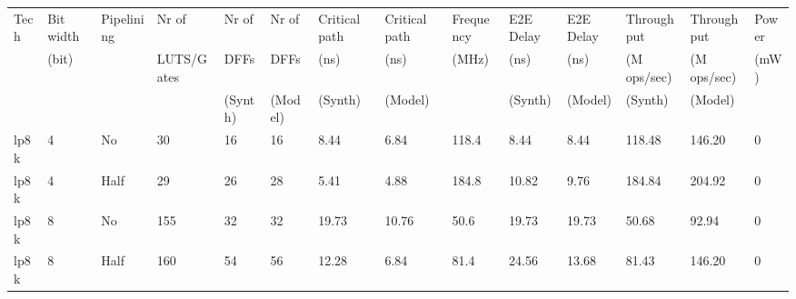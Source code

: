 \begin{tabular}{llllllllllllll}
\hline
\hline
 {Tech} & {Bit width} & {Pipelining} & {Nr of}      & {Nr of}   & {Nr of}   & {Critical path} & {Critical path} & {Frequency} & {E2E Delay} & {E2E Delay} & {Throughput}  & {Throughput}  & {Power} \\
        & {(bit)}     &              & {LUTS/Gates} & {DFFs}    & {DFFs}    & {(ns)}          & {(ns)}          & {(MHz)}     & {(ns)}      & {(ns)}      & {(M ops/sec)} & {(M ops/sec)} & {(mW)}  \\
        &             &              &              & {(Synth)} & {(Model)} & {(Synth)}       & {(Model)}       &             & {(Synth)}   & {(Model)}   & {(Synth)}     & {(Model)}     &         \\
 {lp8k} & 4           & {No}         & 30           & 16        & 16        & 8.44            & 6.84            & 118.4       & 8.44        & 8.44        & 118.48        & 146.20        & 0       \\
 {lp8k} & 4           & {Half}       & 29           & 26        & 28        & 5.41            & 4.88            & 184.8       & 10.82       & 9.76        & 184.84        & 204.92        & 0       \\
 {lp8k} & 8           & {No}         & 155          & 32        & 32        & 19.73           & 10.76           & 50.6        & 19.73       & 19.73       & 50.68         & 92.94         & 0       \\
 {lp8k} & 8           & {Half}       & 160          & 54        & 56        & 12.28           & 6.84            & 81.4        & 24.56       & 13.68       & 81.43         & 146.20        & 0       \\
\hline
\end{tabular}
